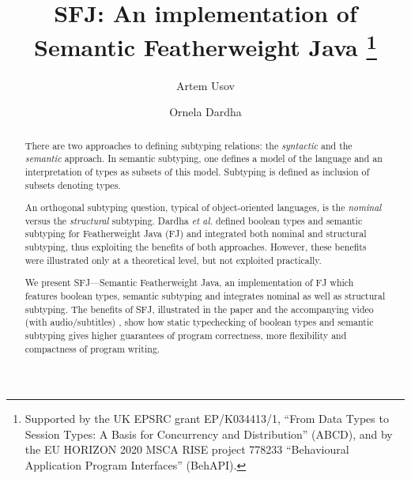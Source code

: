 \documentclass[runningheads]{llncs}
\begin{document}
\title{SFJ: An implementation of Semantic Featherweight Java
    \thanks{Supported by the UK EPSRC grant EP/K034413/1, ``From Data Types to Session Types: A Basis for Concurrency and Distribution'' (ABCD), and by the EU HORIZON 2020 MSCA RISE project 778233
    ``Behavioural Application Program Interfaces'' (BehAPI).}
}

\author{Artem Usov \and Ornela Dardha}


\maketitle

\begin{abstract}
    There are two approaches to defining subtyping relations: the \emph{syntactic} and the \emph{semantic} approach.
    In semantic subtyping, one defines a model of the language and an interpretation of types as subsets of this model.
    Subtyping is defined as inclusion of subsets denoting types.

    An orthogonal subtyping question, typical of object-oriented languages, is the \emph{nominal} versus the \emph{structural} subtyping.
    Dardha \emph{et al.} \cite{Dardha2013,Dardha2017} defined boolean types and semantic subtyping for Featherweight Java (FJ) and integrated both nominal and structural subtyping, thus exploiting the benefits of both approaches.
    However, these benefits were illustrated only at a theoretical level, but not exploited practically.

    We present SFJ---Semantic Featherweight Java, an implementation of FJ which features boolean types, semantic subtyping and integrates nominal as well as structural subtyping.
    The benefits of SFJ, illustrated in the paper and the accompanying video (with audio/subtitles) \cite{UD20}, show how static typechecking of boolean types and semantic subtyping gives higher guarantees of program correctness, more flexibility and compactness of program writing.
\end{abstract}
\end{document}
